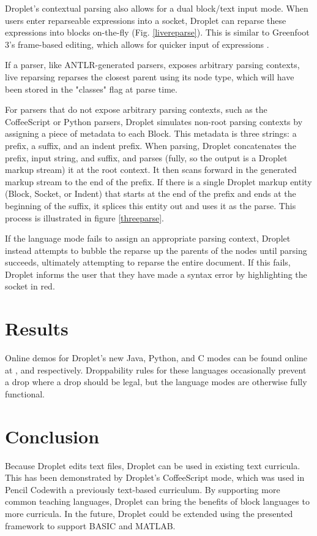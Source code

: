 \documentclass[conference]{IEEEtran}
\begin{document}
Droplet's contextual parsing also allows for a dual block/text input mode. When users enter reparseable expressions into a socket, Droplet can reparse these expressions into blocks on-the-fly (Fig. \ref{livereparse}). This is similar to Greenfoot 3's frame-based editing, which allows for quicker input of expressions \cite{Greenfoot3}.

If a parser, like ANTLR-generated parsers, exposes arbitrary parsing contexts, live reparsing reparses the closest parent using its node type, which will have been stored in the "classes" flag at parse time.

For parsers that do not expose arbitrary parsing contexts, such as the CoffeeScript or Python parsers, Droplet simulates non-root parsing contexts by assigning a piece of metadata to each Block. This metadata is three strings: a prefix, a suffix, and an indent prefix. When parsing, Droplet concatenates the prefix, input string, and suffix, and parses (fully, so the output is a Droplet markup stream) it at the root context. It then scans forward in the generated markup stream to the end of the prefix. If there is a single Droplet markup entity (Block, Socket, or Indent) that starts at the end of the prefix and ends at the beginning of the suffix, it splices this entity out and uses it as the parse. This process is illustrated in figure \ref{threeparse}.

If the language mode fails to assign an appropriate parsing context, Droplet instead attempts to bubble the reparse up the parents of the nodes until parsing succeeds, ultimately attempting to reparse the entire document. If this fails, Droplet informs the user that they have made a syntax error by highlighting the socket in red.

\section{Results}

Online demos for Droplet's new Java, Python, and C modes can be found online at \cite{JavaExample}, \cite{PythonExample} and \cite{CExample} respectively. Droppability rules for these languages occasionally prevent a drop where a drop should be legal, but the language modes are otherwise fully functional.

\section{Conclusion}

Because Droplet edits text files, Droplet can be used in existing text curricula. This has been demonstrated by Droplet's CoffeeScript mode, which was used in Pencil Codewith a previously text-based curriculum. By supporting more common teaching languages, Droplet can bring the benefits of block languages to more curricula. In the future, Droplet could be extended using the presented framework to support BASIC and MATLAB.
\end{document}

